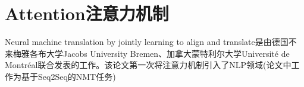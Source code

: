 \section{Attention注意力机制}\label{component:Attention}
Neural machine translation by jointly learning to align and translate\cite{Attention}是由德国不来梅雅各布大学Jacobs University Bremen、加拿大蒙特利尔大学Université de Montréal联合发表的工作。该论文第一次将注意力机制引入了NLP领域(论文中工作为基于Seq2Seq的NMT任务)